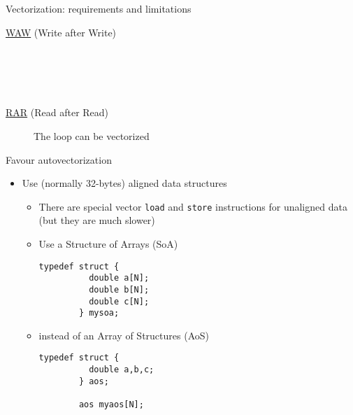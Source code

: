 \documentclass[10pt,xcolor=table]{beamer}
\begin{document}
\begin{frame}[fragile]{Vectorization: requirements and limitations}

  \begin{description}
  \item[\underline{WAW} (Write after Write)] ~\\
    \begin{columns}
       \
    \end{columns}

  \item[\underline{RAR} (Read after Read)] The loop can be vectorized
  \end{description}
\end{frame}

\begin{frame}[fragile]{Favour autovectorization}

  \begin{itemize}
  \item Use (normally 32-bytes) aligned data structures
    \begin{itemize}
    \item There are special vector {\tt load} and {\tt store} instructions for unaligned data {\small (but they are much slower)}
    \item Use a Structure of Arrays (SoA)
      \begin{lstlisting}[style=c]
        typedef struct {
          double a[N];
          double b[N];
          double c[N];
        } mysoa;
      \end{lstlisting}
    \item instead of an Array of Structures (AoS)
      \begin{lstlisting}[style=c]
        typedef struct {
          double a,b,c;
        } aos;

        aos myaos[N];
      \end{lstlisting}
    \end{itemize}
  \end{itemize}

\end{frame}
\end{document}
